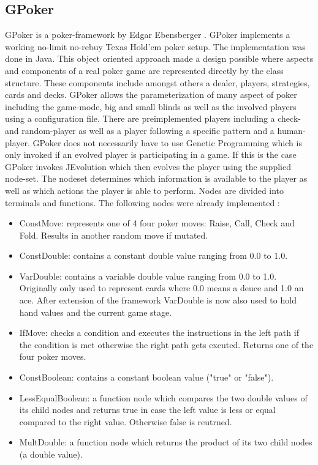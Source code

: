 \documentclass[12pt,fleqn,a4paper]{article}
\begin{document}
\subsection{GPoker}
GPoker is a poker-framework by Edgar Ebensberger \cite{GPoker}. GPoker implements a working no-limit no-rebuy Texas Hold'em poker setup. The implementation was done in Java. This object oriented approach made a design possible where aspects and components of a real poker game are represented directly by the class structure. These components include amongst others a dealer, players, strategies, cards and decks. GPoker allows the parameterization of many aspect of poker including the game-mode, big and small blinds as well as the involved players using a configuration file. There are preimplemented players including a check- and random-player as well as a player following a specific pattern and a human-player.
GPoker does not necessarily have to use Genetic Programming which is only invoked if an evolved player is participating in a game.
If this is the case GPoker invokes JEvolution which then evolves the player using the supplied node-set. The nodeset determines which information is available to the player as well as which actions the player is able to perform. Nodes are divided into terminals and functions. The following nodes were already implemented \cite{GPoker}:
\label{sec:nodes}
\begin{itemize}
	\item ConstMove: represents one of 4 four poker moves: Raise, Call, Check and Fold. Results in another random
	move if mutated.
	\item ConstDouble: contains a constant double value ranging from 0.0 to 1.0.
	\item VarDouble: contains a variable double value ranging from 0.0 to 1.0. Originally only used to represent
	cards where 0.0 means a deuce and 1.0 an ace. After extension of the framework VarDouble is now also used to
	hold hand values and the current game stage.
	\item IfMove: checks a condition and executes the instructions in the left path if the condition is met otherwise the right path gets excuted. Returns one of the four poker moves.
	\item ConstBoolean: contains a constant boolean value ("true" or "false").
	\item LessEqualBoolean: a function node which compares the two double values of its child nodes and returns true in case the left value is less or equal compared to the right value. Otherwise false is reutrned.
	\item MultDouble: a function node which returns the product of its two child nodes (a double value).
\end{itemize}
\end{document}
